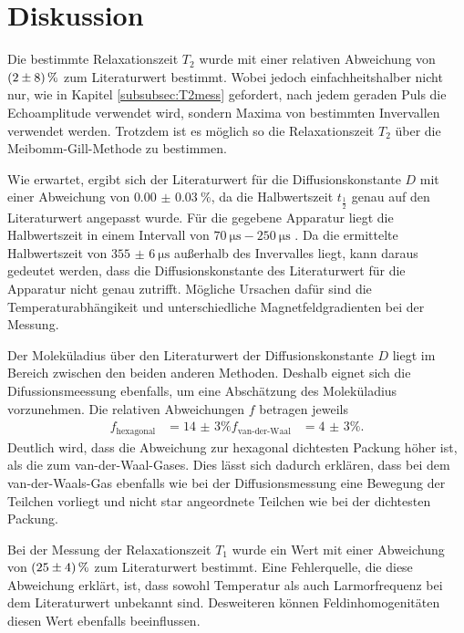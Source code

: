 \newpage
\section{Diskussion}
\label{sec:Diskussion}

Die bestimmte Relaxationszeit $T_{2}$ wurde mit einer
relativen Abweichung von $\SI{2+-8}{\percent}$
zum Literaturwert bestimmt.
Wobei jedoch einfachheitshalber nicht nur, wie in Kapitel \ref{subsubsec:T2mess}
gefordert, nach jedem geraden
Puls die Echoamplitude verwendet wird, sondern Maxima von bestimmten Invervallen verwendet werden.
Trotzdem ist es möglich so die Relaxationszeit $T_{2}$ über die
Meibomm-Gill-Methode zu bestimmen.

Wie erwartet, ergibt sich der Literaturwert für die Diffusionskonstante $D$
mit einer Abweichung von $\SI{0.00(3)}{\percent}$, da die Halbwertszeit $t_{\frac{1}{2}}$
genau auf den Literaturwert angepasst wurde.
Für die gegebene Apparatur liegt die Halbwertszeit in einem Intervall
von $\SI{70}{\micro\second}-\SI{250}{\micro\second}$ \cite{talk}.
Da die ermittelte Halbwertszeit von $\SI{355(6)}{\micro\second}$
außerhalb des Invervalles liegt, kann daraus gedeutet werden,
dass die Diffusionskonstante des Literaturwert für die Apparatur nicht genau zutrifft.
Mögliche Ursachen dafür sind die Temperaturabhängikeit und unterschiedliche
Magnetfeldgradienten bei der Messung.

Der Moleküladius über den Literaturwert der Diffusionskonstante $D$
liegt im Bereich zwischen den beiden anderen Methoden. Deshalb eignet sich die
Difussionsmeessung ebenfalls, um eine Abschätzung des Moleküladius vorzunehmen.
Die relativen Abweichungen $f$ betragen jeweils
\begin{align*}
  f_{\text{hexagonal}}&=\num{14(3)}{\percent}
  f_{\text{van-der-Waal}}&=\num{4(3)}{\percent}.
\end{align*}
Deutlich wird, dass die Abweichung zur hexagonal dichtesten Packung
höher ist, als die zum van-der-Waal-Gases.
Dies lässt sich dadurch erklären, dass bei dem van-der-Waals-Gas
ebenfalls
wie bei der Diffusionsmessung eine Bewegung der Teilchen vorliegt
und nicht star angeordnete Teilchen wie bei der dichtesten Packung.



Bei der Messung der Relaxationszeit $T_{1}$ wurde ein Wert mit einer Abweichung von $\SI{25+-4}{\percent}$ zum Literaturwert bestimmt.
Eine Fehlerquelle, die diese Abweichung erklärt,
ist, dass sowohl Temperatur als auch Larmorfrequenz bei dem Literaturwert unbekannt sind.
Desweiteren können Feldinhomogenitäten diesen Wert ebenfalls beeinflussen.

